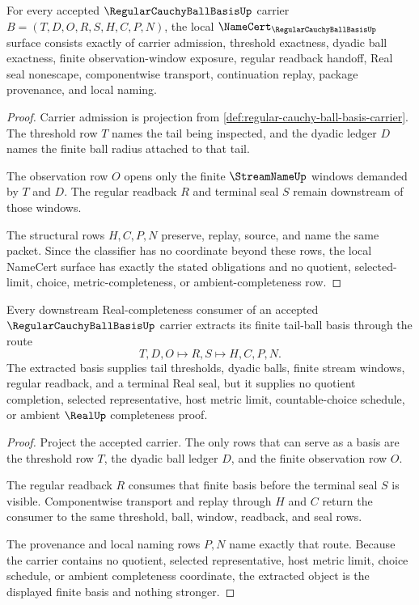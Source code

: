 \begin{theorem}\label{thm:regular-cauchy-ball-basis-namecert-obligations}
For every accepted $\RegularCauchyBallBasisUp$ carrier $B=(T,D,O,R,S,H,C,P,N)$, the local $\NameCert_{\RegularCauchyBallBasisUp}$ surface consists exactly of carrier admission, threshold exactness, dyadic ball exactness, finite observation-window exposure, regular readback handoff, Real seal nonescape, componentwise transport, continuation replay, package provenance, and local naming.
\end{theorem}
\begin{proof}
Carrier admission is projection from \autoref{def:regular-cauchy-ball-basis-carrier}. The threshold row $T$ names the tail being inspected, and the dyadic ledger $D$ names the finite ball radius attached to that tail.

The observation row $O$ opens only the finite $\StreamNameUp$ windows demanded by $T$ and $D$. The regular readback $R$ and terminal seal $S$ remain downstream of those windows.

The structural rows $H,C,P,N$ preserve, replay, source, and name the same packet. Since the classifier has no coordinate beyond these rows, the local NameCert surface has exactly the stated obligations and no quotient, selected-limit, choice, metric-completeness, or ambient-completeness row.
\end{proof}

\begin{theorem}\label{thm:regular-cauchy-ball-basis-tail-extraction}
Every downstream Real-completeness consumer of an accepted $\RegularCauchyBallBasisUp$ carrier extracts its finite tail-ball basis through the route
$$
T,D,O \longmapsto R,S \longmapsto H,C,P,N .
$$
The extracted basis supplies tail thresholds, dyadic balls, finite stream windows, regular readback, and a terminal Real seal, but it supplies no quotient completion, selected representative, host metric limit, countable-choice schedule, or ambient $\RealUp$ completeness proof.
\end{theorem}
\begin{proof}
Project the accepted carrier. The only rows that can serve as a basis are the threshold row $T$, the dyadic ball ledger $D$, and the finite observation row $O$.

The regular readback $R$ consumes that finite basis before the terminal seal $S$ is visible. Componentwise transport and replay through $H$ and $C$ return the consumer to the same threshold, ball, window, readback, and seal rows.

The provenance and local naming rows $P,N$ name exactly that route. Because the carrier contains no quotient, selected representative, host metric limit, choice schedule, or ambient completeness coordinate, the extracted object is the displayed finite basis and nothing stronger.
\end{proof}

